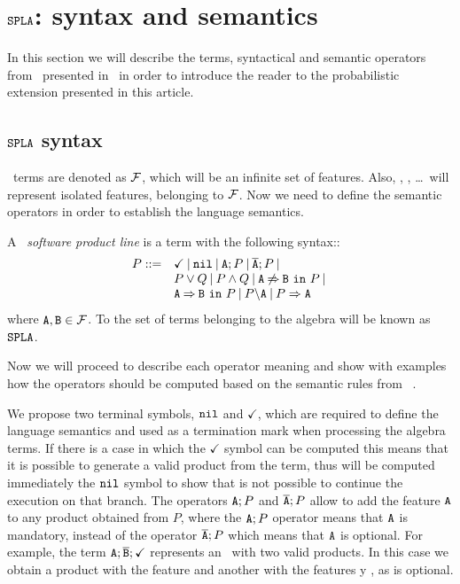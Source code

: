 

\section{$\fodaPA$: syntax and semantics}
\label{sec:foda:sintaxMain}

In this section we will describe the 
terms, syntactical and semantic operators
from \fodaPA\ presented in~\cite{acl13}
in order to introduce the
reader to the probabilistic extension presented in this article.


\subsection{$\fodaPA$ syntax}

\fodaPA\ terms are denoted as $\calF$,
which will be an infinite set of features.
Also, , , \dots\ will
represent isolated features, belonging to $\calF$.
%
Now we need to define the semantic operators in order to establish the
language semantics.

\bdfn\label{dfn:syntax}
A \fodaPA\ \emph{software product line} is a term
with the following syntax::
$$
\begin{array}{ll}
  P::=&   \checkmark \barra \nil \barra \feature{A};P \barra \ofeature{A};P \barra\\
        &  P \choice Q \barra P\paral Q  \barra   \exclude{A}{B}{P}\barra\\
        & \require{A}{B}{P}\barra  \forbid{A}{P}\barra  \mandatory{A}{P}
\end{array}     
$$
\noindent 
where $\feature{A},\feature{B} \in \calF$.
To the set of terms belonging to the algebra
will be known as $\fodaPA$.
\edfn

Now we will proceed to describe each operator meaning and show
with examples how the operators should be computed based on the
semantic rules from ~\cite{acl13}.

We propose two terminal symbols, $\nil$ and $\checkmark$,
which are required to define the language
semantics and used as a termination mark when processing the
algebra terms.
If there is a case in which the $\checkmark$ symbol can be computed
this means that it is possible to generate a
valid product from the term, thus
will be computed immediately the $\nil$ symbol to
show that is not possible to continue the execution on that
branch.
%
The operators $\feature{A};P$ and $\ofeature{A};P$
allow to add the feature $\feature{A}$ to any product obtained
from $P$, where the $\feature{A};P$ operator means that
$\feature{A}$ is mandatory,
instead of the operator $\ofeature{A};P$ which means that
$\feature{A}$ is optional.
%
For example, the term $\feature{A};\ofeature{B};\checkmark$ represents
an \SPL\ with two valid products. In this case we obtain
a product with the feature  and another with the features
 y , as  is optional.

